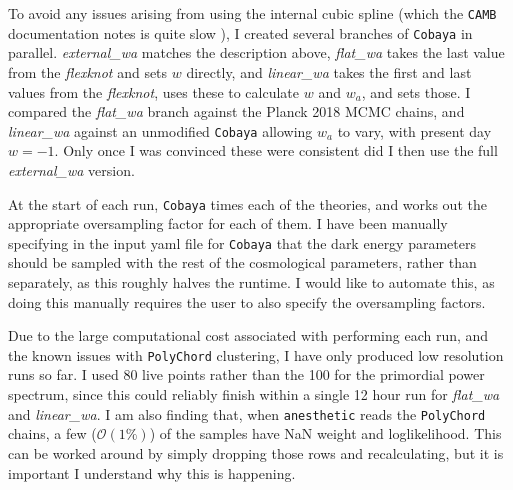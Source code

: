\documentclass{article}
\begin{document}
To avoid any issues arising from using the internal cubic spline (which the \texttt{CAMB} documentation notes is quite slow \cite{CAMBdocs}), I created several branches of \texttt{Cobaya} in parallel. \textit{external\_wa} matches the description above, \textit{flat\_wa} takes the last value from the \textit{flexknot} and sets $w$ directly, and \textit{linear\_wa} takes the first and last values from the \textit{flexknot}, uses these to calculate $w$ and $w_a$, and sets those. I compared the \textit{flat\_wa} branch against the Planck 2018 MCMC chains, and \textit{linear\_wa} against an unmodified \texttt{Cobaya} allowing $w_a$ to vary, with present day $w=-1$. Only once I was convinced these were consistent did I then use the full \textit{external\_wa} version.

At the start of each run, \texttt{Cobaya} times each of the theories, and works out the appropriate oversampling factor for each of them. I have been manually specifying in the input yaml file for \texttt{Cobaya} that the dark energy parameters should be sampled with the rest of the cosmological parameters, rather than separately, as this roughly halves the runtime. I would like to automate this, as doing this manually requires the user to also specify the oversampling factors.

Due to the large computational cost associated with performing each run, and the known issues with \texttt{PolyChord} clustering, I have only produced low resolution runs so far. I used 80 live points rather than the 100 for the primordial power spectrum, since this could reliably finish within a single 12 hour run for \textit{flat\_wa} and \textit{linear\_wa}. I am also finding that, when \texttt{anesthetic} reads the \texttt{PolyChord} chains, a few ($\mathcal{O}(1\%)$) of the samples have NaN weight and loglikelihood. This can be worked around by simply dropping those rows and recalculating, but it is important I understand why this is happening. 
\end{document}
